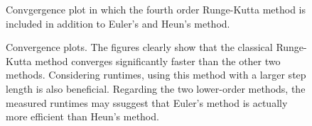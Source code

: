\documentclass{article}
\begin{document}
\begin{figure}
    \centering
    
\end{figure}

\begin{figure}
    \centering
    
\end{figure}

\begin{figure}
    \centering
    
\end{figure}

\begin{figure}[htbp]
    \centering
            
        \label{fig:convergence_plot_all}
        \caption{Convgergence plot in which the fourth order Runge-Kutta method is included in addition to Euler's and Heun's method.}
    \caption{Convergence plots. The figures clearly show that the classical Runge-Kutta method converges significantly faster than the other two methods. Considering runtimes, using this method with a larger step length is also beneficial. Regarding the two lower-order methods, the measured runtimes may ssuggest that Euler's method is actually more efficient than Heun's method.}
\end{figure}

%    

\begin{figure}
    \centering
    
\end{figure}
\end{document}
